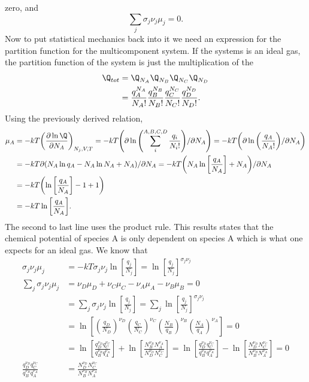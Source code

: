 zero, and
\begin{equation*}
	\sum_{j}{\sigma_j \nu_j \mu_j} = 0.
\end{equation*}
Now to put statistical mechanics back into it we need an expression for the
partition function for the multicomponent system.  If the systems is an ideal
gas, the partition function of the system is just the multiplication of the
\begin{align*}
	\Q_{tot} &= \Q_{N_{A}} \Q_{N_B} \Q_{N_C} \Q_{N_{D}}\\
			&= \frac{q_{A}^{N_A}}{N_A !} \frac{q_{B}^{N_B}}{N_B !}
			   \frac{q_{C}^{N_C}}{N_C !} \frac{q_{D}^{N_D}}{N_D !}.
\end{align*}
Using the previously derived relation,
\begin{align*}
	\mu_A &= -kT {\left(\frac{\partial \ln{\Q}}{\partial N_{A}}\right)}_{N_j, V,
			T} = -kT {\left(\partial \ln{\left(\sum_{i}^{A, B, C, D}
		{\frac{q_{i}}{N_i !}}\right)} /
		\partial N_A \right)}
			 = -kT {\left(\partial \ln{\left(\frac{q_{A}}{N_A !}\right)} /
		\partial N_A \right)}\\
		  &= -kT \partial(N_{A} \ln{q_{A}} - N_{A}\ln{N_{A}} + N_{A}) / \partial N_A
		  = -kT {\left( N_A \ln{\left[\frac{q_A}{N_{A}}\right]} + N_A \right)} /
		  \partial N_A \\
		  &= -kT {\left( \ln{\left[ \frac{q_A}{N_A} \right]} - 1 + 1 \right)}\\
		  &= -kT \ln{\left[ \frac{q_A}{N_A} \right]}.
\end{align*}
The second to last line uses the product rule. This results states that the
chemical potential of species A is only dependent on species A which is what one
expects for an ideal gas. We know that
\begin{align*}
	\sigma_j \nu_j \mu_j &= -kT \sigma_j \nu_j \ln{\left[ \frac{q_j}{N_j}
	\right]} = \ln{\left[ \frac{q_j}{N_j} \right]}^{\sigma_j \nu_{j}}\\  
	\sum_{j}{\sigma_j \nu_j \mu_j} &= \nu_D \mu_D + \nu_C \mu_C - \nu_A \mu_A -
	\nu_B \mu_B =0 \\
		&= \sum_{j}{\sigma_j \nu_j \ln{\left[ \frac{q_j}{N_j} \right]}}
		= \sum_{j}{\ln{\left[ \frac{q_j}{N_j} \right]}^{\sigma_j \nu_{j}}}\\
		&= \ln{\left[ {\left(\frac{q_D}{N_{D}}\right)}^{\nu_D}
		{\left(\frac{q_C}{N_{C}}\right)}^{\nu_C}
		{\left(\frac{N_B}{q_{B}}\right)}^{\nu_B}
		{\left(\frac{N_A}{q_{A}}\right)}^{\nu_A} \right]} = 0\\
		&= \ln{\left[
			\frac{q_{D}^{\nu_D}q_{C}^{\nu_C}}{q_{B}^{\nu_B}q_{A}^{\nu_A}}
			\right]} +
			\ln{\left[
			\frac{N_{B}^{\nu_B}N_{A}^{\nu_A}}{N_{D}^{\nu_D}N_{C}^{\nu_C}}
			\right]} = 
			\ln{\left[
			\frac{q_{D}^{\nu_D}q_{C}^{\nu_C}}{q_{B}^{\nu_B}q_{A}^{\nu_A}}
			\right]} -
			\ln{\left[
			\frac{N_{D}^{\nu_D}N_{C}^{\nu_C}}{N_{B}^{\nu_B}N_{A}^{\nu_A}}
			\right]} = 0 \\
	\frac{q_{D}^{\nu_D}q_{C}^{\nu_C}}{q_{B}^{\nu_B}q_{A}^{\nu_A}} &= 
		\frac{N_{D}^{\nu_D}N_{C}^{\nu_C}}{N_{B}^{\nu_B}N_{A}^{\nu_A}} 
\end{align*}
